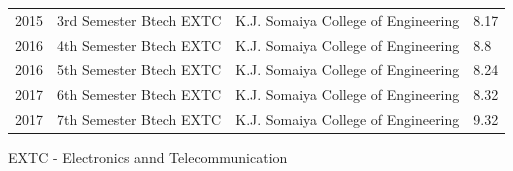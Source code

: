 \documentclass[letterpaper,11pt]{article}
\begin{document}
\begin{table}[h!]
\begin{center}
\begin{tabular}{l|c|r|l}
		2015 & \hspace{0.2cm} 3rd Semester Btech EXTC \hspace{0.2cm} & \hspace{0.2cm}K.J. Somaiya College of Engineering\hspace{0.2cm} & \hspace{1.2cm} 8.17 \hspace{0.2cm}\\
		2016 & \hspace{0.2cm} 4th Semester Btech EXTC \hspace{0.2cm} & \hspace{0.2cm}K.J. Somaiya College of Engineering\hspace{0.2cm} & \hspace{1.2cm} 8.8 \hspace{0.2cm}\\
		2016 & \hspace{0.2cm} 5th Semester Btech EXTC \hspace{0.2cm} & \hspace{0.2cm}K.J. Somaiya College of Engineering\hspace{0.2cm} & \hspace{1.2cm} 8.24 \hspace{0.2cm}\\
		2017 & \hspace{0.2cm} 6th Semester Btech EXTC \hspace{0.2cm} & \hspace{0.2cm}K.J. Somaiya College of Engineering\hspace{0.2cm} & \hspace{1.2cm} 8.32 \hspace{0.2cm}\\
		2017 & \hspace{0.2cm} 7th Semester Btech EXTC \hspace{0.2cm} & \hspace{0.2cm}K.J. Somaiya College of Engineering\hspace{0.2cm} & \hspace{1.2cm} 9.32 \hspace{0.2cm}\\
		      
          \end{tabular}
  \end{center}
\end{table}

EXTC - Electronics annd Telecommunication \\
\textbf{}  \\
\end{document}
